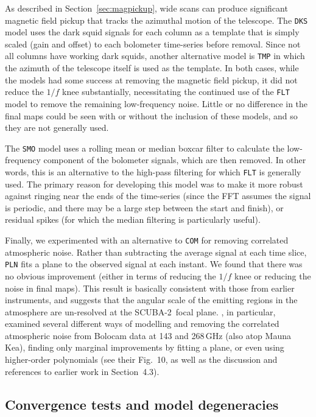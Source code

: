 \documentclass[useAMS,usenatbib,nofootinbib]{mn2e}
\newcommand{\scuba}{SCUBA-2}
\newcommand{\model}[1]{\texttt{#1}}
\begin{document}
As described in Section~\ref{sec:magpickup}, wide scans can produce
significant magnetic field pickup that tracks the azimuthal motion of
the telescope. The \model{DKS} model uses the dark squid signals for
each column as a template that is simply scaled (gain and offset) to
each bolometer time-series before removal. Since not all columns have
working dark squids, another alternative model is \model{TMP} in which
the azimuth of the telescope itself is used as the template. In both
cases, while the models had some success at removing the magnetic
field pickup, it did not reduce the $1/f$ knee substantially,
necessitating the continued use of the \model{FLT} model to remove the
remaining low-frequency noise. Little or no difference in the final
maps could be seen with or without the inclusion of these models, and
so they are not generally used.

The \model{SMO} model uses a rolling mean or median boxcar filter to
calculate the low-frequency component of the bolometer signals, which
are then removed. In other words, this is an alternative to the
high-pass filtering for which \model{FLT} is generally used. The
primary reason for developing this model was to make it more robust
against ringing near the ends of the time-series (since the FFT
assumes the signal is periodic, and there may be a large step between
the start and finish), or residual spikes (for which the median
filtering is particularly useful).

Finally, we experimented with an alternative to \model{COM} for
removing correlated atmospheric noise. Rather than subtracting the
average signal at each time slice, \model{PLN} fits a plane to the
observed signal at each instant. We found that there was no obvious
improvement (either in terms of reducing the $1/f$ knee or reducing
the noise in final maps). This result is basically consistent with
those from earlier instruments, and suggests that the angular scale of
the emitting regions in the atmosphere are un-resolved at the \scuba\
focal plane. \citet{sayers2010}, in particular, examined several
different ways of modelling and removing the correlated atmospheric
noise from Bolocam data at 143 and 268\,GHz (also atop Mauna Kea),
finding only marginal improvements by fitting a plane, or even using
higher-order polynomials (see their Fig.~10, as well as the discussion
and references to earlier work in Section~4.3).

\subsection{Convergence tests and model degeneracies}
\label{sec:converge}
\end{document}
